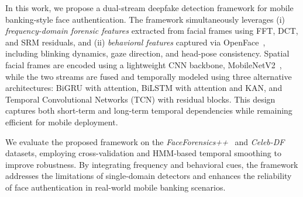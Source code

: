 \documentclass[conference]{IEEEtran}
\begin{document}
In this work, we propose a dual-stream deepfake detection framework for mobile banking-style face authentication. The framework simultaneously leverages (i) \emph{frequency-domain forensic features} extracted from facial frames using FFT, DCT, and SRM residuals, and (ii) \emph{behavioral features} captured via OpenFace~\cite{b18}, including blinking dynamics, gaze direction, and head-pose consistency. Spatial facial frames are encoded using a lightweight CNN backbone, MobileNetV2~\cite{b17}, while the two streams are fused and temporally modeled using three alternative architectures: BiGRU with attention, BiLSTM with attention and KAN, and Temporal Convolutional Networks (TCN) with residual blocks. This design captures both short-term and long-term temporal dependencies while remaining efficient for mobile deployment.

We evaluate the proposed framework on the \emph{FaceForensics++}~\cite{b8,b13} and \emph{Celeb-DF}~\cite{b14} datasets, employing cross-validation and HMM-based temporal smoothing to improve robustness. By integrating frequency and behavioral cues, the framework addresses the limitations of single-domain detectors and enhances the reliability of face authentication in real-world mobile banking scenarios.



\end{document}
